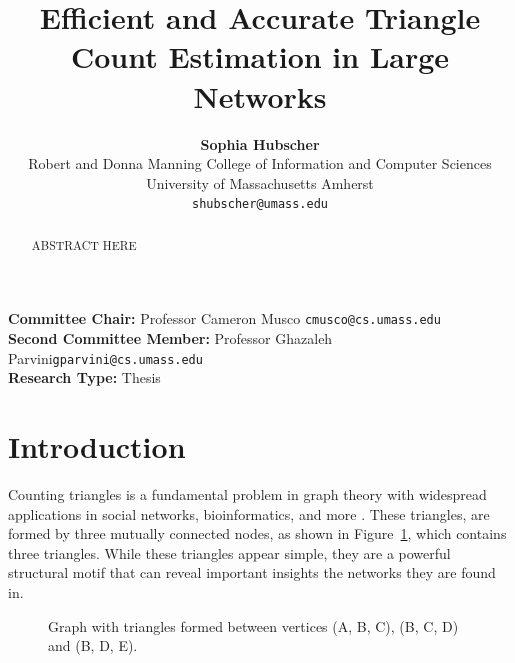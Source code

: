 \documentclass[11pt]{article}
\title{Efficient and Accurate Triangle Count Estimation in Large Networks}
\date{}
\author{
  \textbf{Sophia Hubscher}\\
  Robert and Donna Manning College of Information and Computer Sciences\\
  University of Massachusetts Amherst\\
  \texttt{shubscher@umass.edu}\\
}
\begin{document}
\maketitle

\vfill

\noindent\textbf{Committee Chair: }Professor Cameron Musco
\;\;\;\texttt{cmusco@cs.umass.edu} \\
\textbf{Second Committee Member: }Professor Ghazaleh Parvini\;\;\;\texttt{gparvini@cs.umass.edu} \\
\textbf{Research Type: } Thesis \\

\newpage

\begin{abstract}
ABSTRACT HERE
\end{abstract}

\newpage

\tableofcontents

\newpage

\section{Introduction}

Counting triangles is a fundamental problem in graph theory with widespread applications in social networks, bioinformatics, and more \cite{lovasz_large_2012}.
These triangles, are formed by three mutually connected nodes, as shown in Figure~\ref{fig:triangles}, which contains three triangles.
While these triangles appear simple, they are a powerful structural motif that can reveal important insights the networks they are found in.

\begin{figure}[H]
    \centering
    \begin{minipage}{0.45\textwidth}
        \caption{Graph with triangles formed between vertices (A, B, C), (B, C, D) and (B, D, E).}
        \label{fig:triangles}
    \end{minipage}%
\end{figure}
\end{document}
